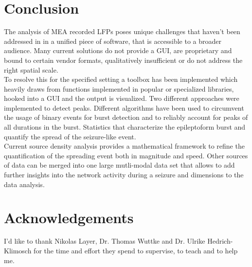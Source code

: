 \documentclass[11pt, twocolumn]{article}
\begin{document}
\section{Conclusion}
The analysis of MEA recorded LFPs poses unique challenges that haven't been addressed in in a unified piece of software, that is accessible to a broader audience. Many current solutions do not provide a GUI, are proprietary and bound to certain vendor formats, qualitatively insufficient or do not address the right spatial scale. \\
To resolve this for the specified setting a toolbox has been implemented which heavily draws from functions implemented in popular or specialized libraries, hooked into a GUI and the output is visualized.
Two different approaches were implemented to detect peaks.
Different algorithms have been used to circumvent the usage of binary events for burst detection and to reliably account for peaks of all durations in the burst. Statistics that characterize the epileptoform burst and quantify the spread of the seizure-like event. \\
Current source density analysis provides a mathematical framework to refine the quantification of the spreading event both in magnitude and speed.
Other sources of data can be merged into one large mutli-modal data set that allows to add further insights into the network activity during a seizure and dimensions to the data analysis.

\hspace{0pt}\vfill
\section*{Acknowledgements}
\vfill\hspace{0pt}
I'd like to thank Nikolas Layer, Dr. Thomas Wuttke and Dr. Ulrike Hedrich-Klimosch for the time and effort they spend to supervise, to teach and to help me. 
\newpage

\printbibliography
\end{document}
